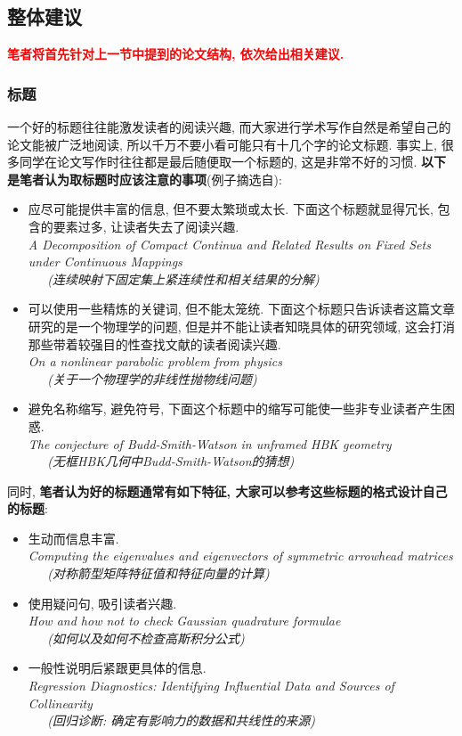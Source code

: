\documentclass{formatBook}
\newcommand{\XG}[1]{\textcolor{red}{#1}}
\begin{document}
\subsection{整体建议}
\XG{\textbf{笔者将首先针对上一节中提到的论文结构, 依次给出相关建议.}}
\subsubsection{标题}
一个好的标题往往能激发读者的阅读兴趣, 而大家进行学术写作自然是希望自己的论文能被广泛地阅读, 所以千万不要小看可能只有十几个字的论文标题. 事实上, 很多同学在论文写作时往往都是最后随便取一个标题的, 这是非常不好的习惯. \textbf{以下是笔者认为取标题时应该注意的事项}(例子摘选自\cite{JungelHow}):
\begin{itemize}
    \item 应尽可能提供丰富的信息, 但不要太繁琐或太长. 下面这个标题就显得冗长, 包含的要素过多, 让读者失去了阅读兴趣{.}\\
          \textit{A Decomposition of Compact Continua and Related Results on Fixed Sets under Continuous Mappings \\ \ \ \  (连续映射下固定集上紧连续性和相关结果的分解)}
    \item 可以使用一些精炼的关键词, 但不能太笼统. 下面这个标题只告诉读者这篇文章研究的是一个物理学的问题, 但是并不能让读者知晓具体的研究领域, 这会打消那些带着较强目的性查找文献的读者阅读兴趣{.}\\
          \textit{On a nonlinear parabolic problem from physics \\ \ \ \  (关于一个物理学的非线性抛物线问题)}
    \item 避免名称缩写, 避免符号, 下面这个标题中的缩写可能使一些非专业读者产生困惑{.}\\
          \textit{The conjecture of Budd-Smith-Watson in unframed HBK geometry  \\ \ \ \ (无框HBK几何中Budd-Smith-Watson的猜想)}
\end{itemize}
\par
同时, \textbf{笔者认为好的标题通常有如下特征, 大家可以参考这些标题的格式设计自己的标题}:
\begin{itemize}
    \item 生动而信息丰富{.}\\
          \textit{Computing the eigenvalues and eigenvectors of symmetric arrowhead matrices \\ \ \ \ (对称箭型矩阵特征值和特征向量的计算)}
    \item 使用疑问句, 吸引读者兴趣{.}\\
          \textit{How and how not to check Gaussian quadrature formulae \\ \ \ \ (如何以及如何不检查高斯积分公式)}
    \item 一般性说明后紧跟更具体的信息{.}\\
          \textit{Regression Diagnostics: Identifying Influential Data and Sources of Collinearity \\  \ \ \
              (回归诊断: 确定有影响力的数据和共线性的来源)}
\end{itemize}
\end{document}
